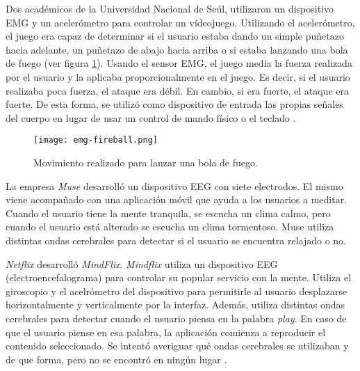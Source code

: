 Dos académicos de la Universidad Nacional de Seúl, utilizaron un dispositivo EMG y un acelerómetro para controlar un vídeojuego. Utilizando el acelerómetro, el juego era capaz de determinar si el usuario estaba dando un simple puñetazo hacia adelante, un puñetazo de abajo hacia arriba o si estaba lanzando una bola de fuego (ver 
figura \ref{fig:fireball}). Usando el sensor EMG, el juego medía la fuerza realizada por el usuario y la aplicaba proporcionalmente en el juego. Es decir, si el usuario realizaba poca fuerza, el ataque era débil. En cambio, si era fuerte, el ataque era fuerte. De esta forma, se utilizó como dispositivo de entrada las propias señales del cuerpo en lugar de usar un control de mando físico o el teclado \cite{emg-fireball}.

\begin{figure}[H]
    \texttt{[image: emg-fireball.png]}
    \caption{Movimiento realizado para lanzar una bola de fuego.}
	\label{fig:fireball}
\end{figure}

La empresa \emph{Muse} desarrolló un dispositivo EEG con siete electrodos. El mismo viene acompañado con una aplicación móvil que ayuda a los usuarios a meditar. Cuando el usuario tiene la mente tranquila, se escucha un clima calmo, pero cuando el usuario está alterado se escucha un clima tormentoso. Muse utiliza distintas ondas cerebrales para detectar si el usuario se encuentra relajado o no.

\emph{Netflix} desarrolló \emph{MindFlix}. \emph{Mindflix} utiliza un dispositivo EEG (electroencefalograma) para controlar su popular servicio con la mente. Utiliza el giroscopio y el acelrómetro del dispositivo para permitirle al usuario desplazarse horizontalmente y verticalmente por la interfaz. Además, utiliza distintas ondas cerebrales para detectar cuando el usuario piensa en la palabra \emph{play}. En caso de que el usuario piense en esa palabra,  la aplicación comienza a reproducir el contenido seleccionado. Se intentó averiguar qué ondas cerebrales se utilizaban y de que forma, pero no se encontró en ningún lugar \cite{mindflix}.
